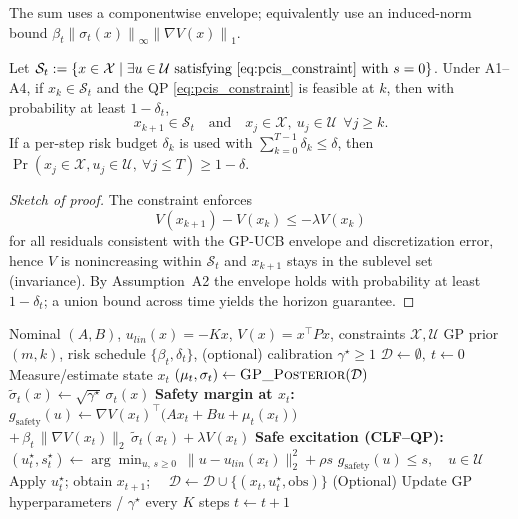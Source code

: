 \documentclass[10pt]{article}
\newcommand{\PCIS}{\mathcal{S}}   %
\newcommand{\Xset}{\mathcal{X}}
\newcommand{\Uset}{\mathcal{U}}
\newcommand{\Vdec}{\lambda}       %
\newcommand{\sig}{\sigma}
\newcommand{\norm}[1]{\left\lVert #1 \right\rVert}
\newcommand{\1}{\mathbbm{1}}
\begin{document}
The sum uses a componentwise envelope; equivalently use an induced-norm bound
$\beta_t \norm{\sig_t(x)}_\infty \norm{\nabla V(x)}_1$.

\begin{theorem}\label{thm:pcis}
Let $\PCIS_t := \{x\in\Xset \mid \exists u\in\Uset \text{ satisfying } \eqref{eq:pcis_constraint} \text{ with } s=0 \}$. 
Under A1–A4, if $x_k\in\PCIS_t$ and the QP \eqref{eq:pcis_constraint} is feasible at $k$, then with probability at least $1-\delta_t$,
\[
x_{k+1}\in\PCIS_t\quad \text{and}\quad x_j\in\Xset,\ u_j\in\Uset\ \ \forall j\ge k.
\]
If a per-step risk budget $\delta_k$ is used with $\sum_{k=0}^{T-1}\delta_k\le \delta$, then
$\Pr(x_j\in \Xset, u_j\in\Uset,\ \forall j\le T) \ge 1-\delta$.
\end{theorem}

\begin{proof}[Sketch of proof]
The constraint enforces
\begin{equation}
V(x_{k+1})-V(x_k)\le -\Vdec V(x_k) \end{equation} for all residuals consistent with the GP-UCB envelope and discretization error, hence $V$ is nonincreasing within $\PCIS_t$ and $x_{k+1}$ stays in the sublevel set (invariance). By Assumption~A2 the envelope holds with probability at least \(1-\delta_t\); a union bound across time
yields the horizon guarantee. \qedhere
\end{proof}

\begin{algorithm}[t]
\small
\caption{Online Safe Exploration with GP-PCIS}
\label{alg:gppcis}
\begin{algorithmic}[1]
\Require Nominal $(A,B)$, $u_{lin}(x)=-Kx$, $V(x)=x^\top P x$, constraints $\mathcal X,\mathcal U$
\Require GP prior $(m,k)$, risk schedule $\{\beta_t,\delta_t\}$, (optional) calibration $\gamma^\star\!\ge\!1$
\State $\mathcal D \gets \emptyset,\ t\gets0$
  \State Measure/estimate state $x_t$
  \State $(\mu_t,\sigma_t)\gets \textsc{GP\_Posterior}(\mathcal D)$
  \State $\tilde\sigma_t(x)\gets \sqrt{\gamma^\star}\,\sigma_t(x)$ 
  \State \textbf{Safety margin at $x_t$:}
  \State $g_{\text{safety}}(u)\gets \nabla V(x_t)^\top\!\big(Ax_t+Bu+\mu_t(x_t)\big)$
  \State \hspace{10mm}$+\,\beta_t\,\|\nabla V(x_t)\|_2\,\tilde\sigma_t(x_t)+\lambda V(x_t)$
  \State \textbf{Safe excitation (CLF--QP):}
  \State $(u_t^\star,s_t^\star)\gets\arg\min_{u,\,s\ge0}\ \|u-u_{lin}(x_t)\|_2^2+\rho s$
  \State \hspace{18mm} $g_{\text{safety}}(u)\le s,\quad u\in\mathcal U$
  \State Apply $u_t^\star$; obtain $x_{t+1}$; \ \ $\mathcal D\gets \mathcal D\cup\{(x_t,u_t^\star,\text{obs})\}$
  \State (Optional) Update GP hyperparameters / $\gamma^\star$ every $K$ steps
  \State $t\gets t+1$
\EndWhile
\end{algorithmic}
\end{algorithm}
\end{document}
